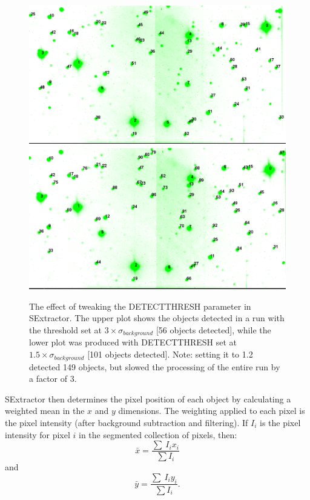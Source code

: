 \begin{figure}
  \centering
  \includegraphics[width=.8\linewidth]{images/2012-09-03_g_default.png}
  \includegraphics[width=.8\linewidth]{images/2012-09-03_g_15sigma.png}
  \caption{The effect of tweaking the DETECT\textunderscore THRESH parameter in SExtractor. The upper plot shows the objects detected in a run with the threshold set at $ 3\times \sigma_{background}$ [56 objects detected], while the lower plot was produced with DETECT\textunderscore THRESH set at $ 1.5\times \sigma_{background}$  [101 objects detected]. Note: setting it to 1.2 detected 149 objects, but slowed the processing of the entire run by a factor of 3. }
\label{fig:tweakingthreshold}
\end{figure}

SExtractor then determines the pixel position of each object by calculating a weighted mean in the $x$ and $y$ dimensions. The weighting applied to each pixel is the pixel intensity (after background subtraction and filtering). If $I_{i}$ is the pixel intensity for pixel $i$ in the segmented collection of pixels, then: \begin{equation}\bar{x} = \frac{\sum\ I_{i}x_{i}}{\sum I_i}\end{equation} and \begin{equation}\bar{y} = \frac{\sum\ I_{i}y_{i}}{\sum I_i}.\end{equation}

